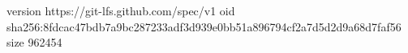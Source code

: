 version https://git-lfs.github.com/spec/v1
oid sha256:8fdcac47bdb7a9bc287233adf3d939e0bb51a896794cf2a7d5d2d9a68d7faf56
size 962454
